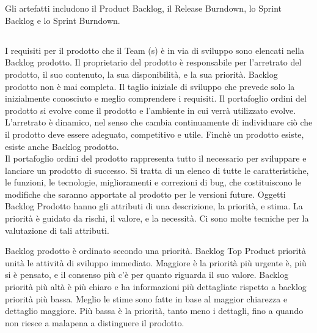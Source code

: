 \section*{\color{Blue}{ARTEFATTI}}
\label{sec:artifacts}
Gli artefatti includono il Product Backlog, il Release Burndown, lo Sprint Backlog e lo Sprint Burndown.

\subsection*{\color{Blue}{PRODUCT BACKLOG E RELEASE BURNDOWN}}
\label{sec:productbacklog}
I requisiti per il prodotto che il Team (s) \`e in via di sviluppo sono elencati nella Backlog prodotto. Il
proprietario del prodotto \`e responsabile per l'arretrato del prodotto, il suo contenuto, la sua disponibilit\`a, e la
sua priorit\`a. Backlog prodotto non \`e mai completa. Il taglio iniziale di sviluppo che prevede solo la inizialmente
conosciuto e meglio comprendere i requisiti. Il portafoglio ordini del prodotto si evolve come il prodotto e l'ambiente
in cui verr\`a utilizzato evolve. L'arretrato \`e dinamico, nel senso che cambia continuamente di individuare ci\`o che
il prodotto deve essere adeguato, competitivo e utile. Finch\`e un prodotto esiste, esiste anche Backlog prodotto.\\
\linebreak 
Il portafoglio ordini del prodotto rappresenta tutto il necessario per sviluppare e lanciare un prodotto di
successo. Si tratta di un elenco di tutte le caratteristiche, le funzioni, le tecnologie, miglioramenti e correzioni di
bug, che costituiscono le modifiche che saranno apportate al prodotto per le versioni future. Oggetti Backlog Prodotto
hanno gli attributi di una descrizione, la priorit\`a, e stima. La priorit\`a \`e guidato da rischi, il valore, e la
necessit\`a. Ci sono molte tecniche per la valutazione di tali attributi.


Backlog prodotto \`e ordinato secondo una priorit\`a. Backlog Top Product priorit\`a unit\`a le attivit\`a di sviluppo
immediato. Maggiore \`e la priorit\`a pi\`u urgente \`e, pi\`u si \`e pensato, e il consenso pi\`u c'\`e per quanto
riguarda il suo valore. Backlog priorit\`a pi\`u alt\`a \`e pi\`u chiaro e ha informazioni pi\`u dettagliate rispetto a
backlog priorit\`a pi\`u bassa. Meglio le stime sono fatte in base al maggior chiarezza e dettaglio maggiore. Pi\`u
bassa \`e la priorit\`a, tanto meno i dettagli, fino a quando non riesce a malapena a distinguere il prodotto.\\
\linebreak

